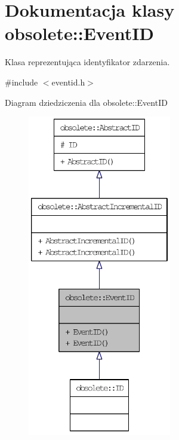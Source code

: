 \hypertarget{classobsolete_1_1EventID}{
\section{Dokumentacja klasy obsolete::EventID}
\label{classobsolete_1_1EventID}
}


Klasa reprezentująca identyfikator zdarzenia.  




{\ttfamily \#include $<$eventid.h$>$}



Diagram dziedziczenia dla obsolete::EventID\nopagebreak
\begin{figure}[H]
\begin{center}
\leavevmode
\includegraphics[height=400pt]{classobsolete_1_1EventID__inherit__graph}
\end{center}
\end{figure}


